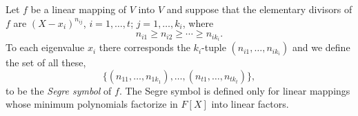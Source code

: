 Let $f$ be a linear mapping of $V$ into $V$ and suppose that the elementary divisors of $f$ are $(X - x_i)^{n_{ij}}$, $i = 1, \ldots, t$; $j = 1, \ldots, k_i$, where
$$n_{i1} \geq n_{i2} \geq \cdots \geq n_{ik_i}.$$
To each eigenvalue $x_i$ there corresponds the $k_i$-tuple $(n_{i1}, \ldots, n_{ik_i})$ and we define the set of all these,
$$\{(n_{11}, \ldots, n_{1k_1}), \ldots, (n_{t1}, \ldots, n_{tk_t})\},$$
to be the \textit{Segre symbol} of $f$. The Segre symbol is defined only for linear mappings whose minimum polynomials factorize in $F[X]$ into linear factors.
